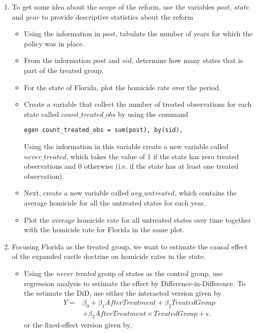 \documentclass[12pt]{article}
\begin{document}
\begin{enumerate}
    \item To get some idea about the scope of the reform, use the variables $post$, $state$ and $year$ to provide descriptive statistics about the reform
    \begin{itemize}
        \item Using the information in $post$, tabulate the number of years for which the policy was in place. 
        \item From the information $post$ and $sid$, determine how many states that is part of the treated group.
        \item For the state of Florida, plot the homicide rate over the period.
        \item Create a variable that collect the number of treated observations for each state called $count\_treated\_obs$ by using the command 
\begin{verbatim}
egen count_treated_obs = sum(post), by(sid),
\end{verbatim}
        Using the information in this variable create a new variable called $never\_treated$, which takes the value of 1 if the state has zero treated observations and 0 otherwise (i.e. if the state has at least one treated observation).
        \item Next, create a new variable called $avg\_untreated$, which contains the average homicide for all the untreated states for each year.
        \item Plot the average homicide rate for all untreated states over time together with the homicide rate for Florida in the same plot.
    \end{itemize}  
    \item Focusing Florida as the treated group, we want to estimate the causal effect of the expanded castle doctrine on homicide rates in the state. 
    \begin{itemize}
        \item Using the \emph{never treated} group of states as the control group, use regression analysis to estimate the effect by Difference-in-Difference. To the estimate the DiD, use either the interacted version given by
    \begin{align}
Y = &\beta_0 + \beta_1 AfterTreatment + \beta_2 TreatedGroup\\ \nonumber
&+ \beta_3 AfterTreatment \times TreatedGroup + \epsilon.
\end{align}
or the fixed-effect version given by,
\begin{equation}

\end{equation}
\end{itemize}
\end{enumerate}
\end{document}
